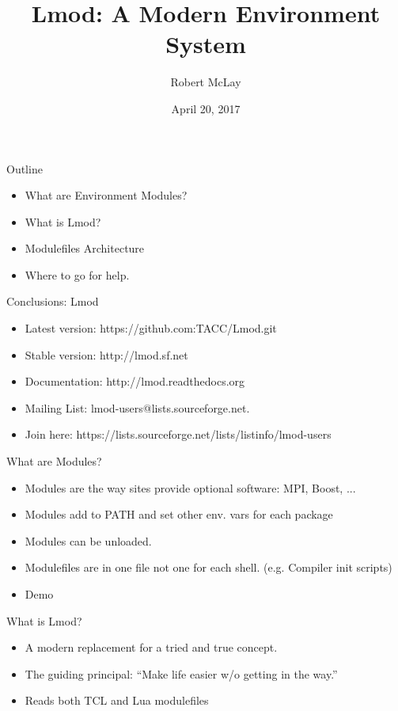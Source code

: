 \documentclass[dvipsnames,aspectratio=169]{beamer}
\begin{document}
\title[Lmod]{Lmod: A Modern Environment System}
\author{Robert McLay} 
\date{April 20, 2017} 


\frame{\titlepage} 

\begin{frame}{Outline}
  \begin{itemize}
    \item What are Environment Modules?
    \item What is Lmod?
    \item Modulefiles Architecture
    \item Where to go for help.
  \end{itemize}
\end{frame}

\begin{frame}{Conclusions: Lmod}
  \begin{itemize}
    \item Latest version: https://github.com:TACC/Lmod.git
    \item Stable version: http://lmod.sf.net
    \item Documentation:  http://lmod.readthedocs.org
    \item Mailing List:   lmod-users@lists.sourceforge.net.
    \item Join here: https://lists.sourceforge.net/lists/listinfo/lmod-users
  \end{itemize}
\end{frame}

\begin{frame}{What are Modules?}
  \begin{itemize}
    \item Modules are the way sites provide optional software: MPI,
      Boost, ...
    \item Modules add to PATH and set other env. vars for each package
    \item Modules can be unloaded.
    \item Modulefiles are in one file not one for each
      shell. (e.g. Compiler init scripts)
    \item Demo
  \end{itemize}
\end{frame}

\begin{frame}{What is Lmod?}
  \begin{itemize}
    \item A modern replacement for a tried and true concept.
    \item The guiding principal: ``Make life easier w/o getting in
      the way.''
    \item Reads both TCL and Lua modulefiles
  \end{itemize}
\end{frame}
\end{document}
